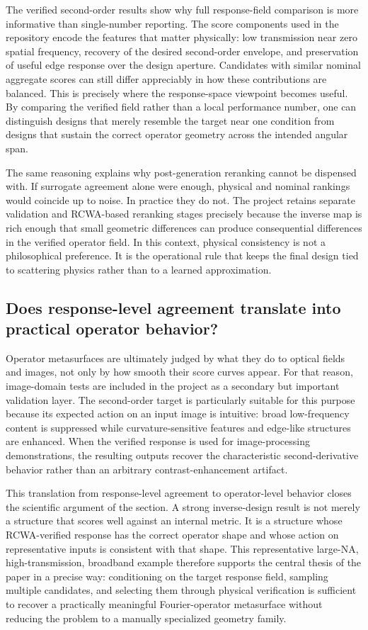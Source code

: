 The verified second-order results show why full response-field comparison is more informative than single-number reporting. The score components used in the repository encode the features that matter physically: low transmission near zero spatial frequency, recovery of the desired second-order envelope, and preservation of useful edge response over the design aperture. Candidates with similar nominal aggregate scores can still differ appreciably in how these contributions are balanced. This is precisely where the response-space viewpoint becomes useful. By comparing the verified field rather than a local performance number, one can distinguish designs that merely resemble the target near one condition from designs that sustain the correct operator geometry across the intended angular span.

The same reasoning explains why post-generation reranking cannot be dispensed with. If surrogate agreement alone were enough, physical and nominal rankings would coincide up to noise. In practice they do not. The project retains separate validation and RCWA-based reranking stages precisely because the inverse map is rich enough that small geometric differences can produce consequential differences in the verified operator field. In this context, physical consistency is not a philosophical preference. It is the operational rule that keeps the final design tied to scattering physics rather than to a learned approximation.

\subsection{Does response-level agreement translate into practical operator behavior?}

Operator metasurfaces are ultimately judged by what they do to optical fields and images, not only by how smooth their score curves appear. For that reason, image-domain tests are included in the project as a secondary but important validation layer. The second-order target is particularly suitable for this purpose because its expected action on an input image is intuitive: broad low-frequency content is suppressed while curvature-sensitive features and edge-like structures are enhanced. When the verified response is used for image-processing demonstrations, the resulting outputs recover the characteristic second-derivative behavior rather than an arbitrary contrast-enhancement artifact.

This translation from response-level agreement to operator-level behavior closes the scientific argument of the section. A strong inverse-design result is not merely a structure that scores well against an internal metric. It is a structure whose RCWA-verified response has the correct operator shape and whose action on representative inputs is consistent with that shape. This representative large-NA, high-transmission, broadband example therefore supports the central thesis of the paper in a precise way: conditioning on the target response field, sampling multiple candidates, and selecting them through physical verification is sufficient to recover a practically meaningful Fourier-operator metasurface without reducing the problem to a manually specialized geometry family.
